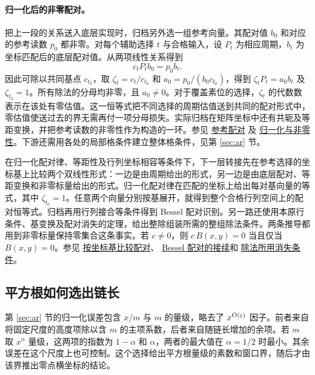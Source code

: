 \documentclass[UTF8,fontset=none,a4paper,11pt]{ctexart}
\theoremstyle{definition}
\newcommand{\src}[3]{\href{https://github.com/leanprover-community/riemann-hypothesis/blob/23aebbb302010b292314d406aa97f7901d698634/src/#1.lean\#L#2}{#3}}
\begin{document}
\paragraph{归一化后的非零配对。}
把上一段的关系送入底层实现时，归档另外选一组参考向量。其配对值 $b_0$ 和对应的参考读数 $p_0$ 都非零。对每个辅助选择 $t$ 与合格输入，设 $P_t$ 为相应周期，$b_t$ 为坐标匹配后的底层配对值。从两项线性关系得到
\[
                     c_tP_t b_0=p_0 b_t .
\]
因此可除以共同基点 $c_{t_0}$，取 $\zeta_t=c_t/c_{t_0}$ 和
$a_0=p_0/(b_0c_{t_0})$，得到 $\zeta_tP_t=a_0b_t$ 及 $\zeta_{t_0}=1$。所有除法的分母均非零，且 $a_0\ne0$。对于覆盖素位的选择，$\zeta_t$ 的代数数表示在该处有零估值。这一恒等式把不同选择的周期估值送到共同的配对形式中，零估值使送过去的界无需再付一项分母损失。实际归档在矩阵坐标中还有共轭及等距变换，并把参考读数的非零性作为构造的一环。参见
\src{Development/AutomorphicArithmetic/ThetaCorrespondence/ThetaPairLifts/ThirdPlaceSeries/MiStar2AtRealisation}{48}{参考配对}
及 \src{Development/AbelianVarietyTheory/Proofs/DecoratedLatticeProofs/MiStar2OfAnchored}{15}{归一化与非零性}。下游还需用各处的局部格条件建立整体格条件，见第 \ref{sec:ar} 节。

在归一化配对律、等距性及行列坐标相容等条件下，下一层转接先在参考选择的坐标基上比较两个双线性形式：一边是由周期给出的形式，另一边是由底层配对、等距变换和非零标量给出的形式。归一化配对律在匹配的坐标上给出每对基向量的等式，其中 $\zeta_{t_0}=1$。任意两个向量分别按基展开，就得到整个合格行列空间上的配对恒等式。归档再用行列接合等条件得到 Bessel 配对识别。另一路还使用本原行条件、基变换及配对消失的定理，给出整除组装所需的整组除法条件。两条推导都用到非零标量保持零集合这条事实。若 $c\ne0$，则 $c\,B(x,y)=0$ 当且仅当 $B(x,y)=0$。参见
\src{Formalism/LocalToGlobal/SiegelLatticeTheory/FlagStabilizerTensors/AdmissibleOfTransported}{84}{按坐标基比较配对}、
\src{Formalism/LocalToGlobal/SiegelLatticeTheory/FlagStabilizerTensors/AdmissibleOfTransported}{150}{Bessel 配对的接续}和
\src{Development/AutomorphicArithmetic/ThetaCorrespondence/ThetaPairLifts/ThirdPlaceSeries/AtHDivGOfMi}{50}{除法所用消失条件}。

\subsection{平方根如何选出链长}
第 \ref{sec:ar} 节的归一化误差包含 $x/m$ 与 $m$ 的量级，略去了 $x^{O(\varepsilon)}$ 因子。前者来自将固定尺度的高度项除以含 $m$ 的主项系数，后者来自随链长增加的余项。若 $m$ 取 $x^\alpha$ 量级，这两项的指数为 $1-\alpha$ 和 $\alpha$，两者的最大值在 $\alpha=1/2$ 时最小。其余误差在这个尺度上也可控制。这个选择给出平方根量级的素数和窗口界，随后才由该界推出零点横坐标的结论。
\end{document}
